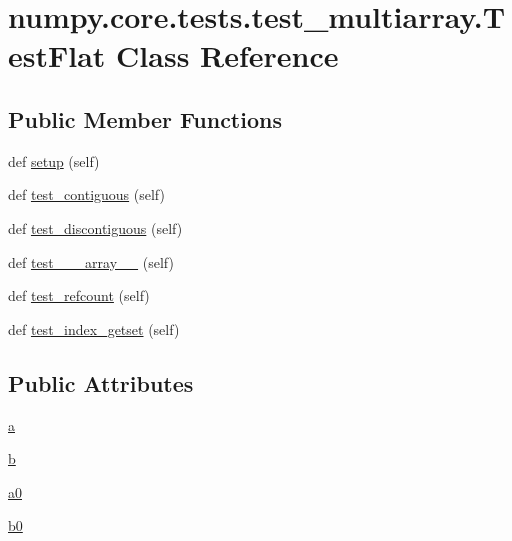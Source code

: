 \hypertarget{classnumpy_1_1core_1_1tests_1_1test__multiarray_1_1TestFlat}{}\section{numpy.\+core.\+tests.\+test\+\_\+multiarray.\+Test\+Flat Class Reference}
\label{classnumpy_1_1core_1_1tests_1_1test__multiarray_1_1TestFlat}
\subsection*{Public Member Functions}
\begin{DoxyCompactItemize}
\item 
def \hyperlink{classnumpy_1_1core_1_1tests_1_1test__multiarray_1_1TestFlat_a598e5ae0bcad56544e7a8294738c802c}{setup} (self)
\item 
def \hyperlink{classnumpy_1_1core_1_1tests_1_1test__multiarray_1_1TestFlat_a6c64c111a07bda42119f30d6376eaab6}{test\+\_\+contiguous} (self)
\item 
def \hyperlink{classnumpy_1_1core_1_1tests_1_1test__multiarray_1_1TestFlat_a0aa38882440eaee3fbca8ada8240138a}{test\+\_\+discontiguous} (self)
\item 
def \hyperlink{classnumpy_1_1core_1_1tests_1_1test__multiarray_1_1TestFlat_a6430b53f5bc487e15559fe3c18c4a0ae}{test\+\_\+\+\_\+\+\_\+array\+\_\+\+\_\+} (self)
\item 
def \hyperlink{classnumpy_1_1core_1_1tests_1_1test__multiarray_1_1TestFlat_a5f6637c8cdd279d016891bc0d639d7c6}{test\+\_\+refcount} (self)
\item 
def \hyperlink{classnumpy_1_1core_1_1tests_1_1test__multiarray_1_1TestFlat_a97c3c0d23ef73ca04448706098635a9f}{test\+\_\+index\+\_\+getset} (self)
\end{DoxyCompactItemize}
\subsection*{Public Attributes}
\begin{DoxyCompactItemize}
\item 
\hyperlink{classnumpy_1_1core_1_1tests_1_1test__multiarray_1_1TestFlat_abc07ce19feace2e84a2fe364814d7727}{a}
\item 
\hyperlink{classnumpy_1_1core_1_1tests_1_1test__multiarray_1_1TestFlat_a5f44e33d12060889d23df2428d6ee7c4}{b}
\item 
\hyperlink{classnumpy_1_1core_1_1tests_1_1test__multiarray_1_1TestFlat_a792b84e1c38d3473ad3d88d3c0ded2b7}{a0}
\item 
\hyperlink{classnumpy_1_1core_1_1tests_1_1test__multiarray_1_1TestFlat_a4aa26ea6c564cd5ac965f62d3b2d99ef}{b0}
\end{DoxyCompactItemize}
